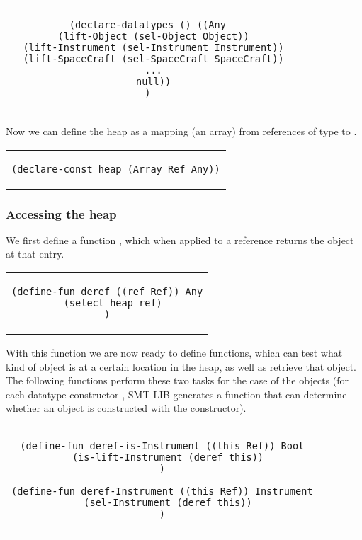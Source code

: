 \begin{center}
\begin{tabular}{c}
\begin{lstlisting}
(declare-datatypes () ((Any
  (lift-Object (sel-Object Object))
  (lift-Instrument (sel-Instrument Instrument))
  (lift-SpaceCraft (sel-SpaceCraft SpaceCraft))
  ...
  null))
)
\end{lstlisting}
\end{tabular}
\end{center}

Now we can define the heap as a mapping (an array) from references of
type  to .

\begin{center}
\begin{tabular}{c}
\begin{lstlisting}
(declare-const heap (Array Ref Any))
\end{lstlisting}
\end{tabular}
\end{center}

\subsubsection{Accessing the heap}

We first define a function , which when applied to a
reference returns the  object at that entry.

\begin{center}
\begin{tabular}{c}
\begin{lstlisting}
(define-fun deref ((ref Ref)) Any
  (select heap ref)
)
\end{lstlisting}
\end{tabular}
\end{center}

With this function we are now ready to define functions, which can test
what kind of object is at a certain location in the heap, as well as
retrieve that object. The following functions perform these two tasks
for the case of the  objects (for each datatype
constructor , SMT-LIB generates a  function that
can determine whether an object is constructed with the constructor).

\begin{center}
\begin{tabular}{c}
\begin{lstlisting}
(define-fun deref-is-Instrument ((this Ref)) Bool
  (is-lift-Instrument (deref this))
)

(define-fun deref-Instrument ((this Ref)) Instrument
  (sel-Instrument (deref this))
)
\end{lstlisting}
\end{tabular}
\end{center}

